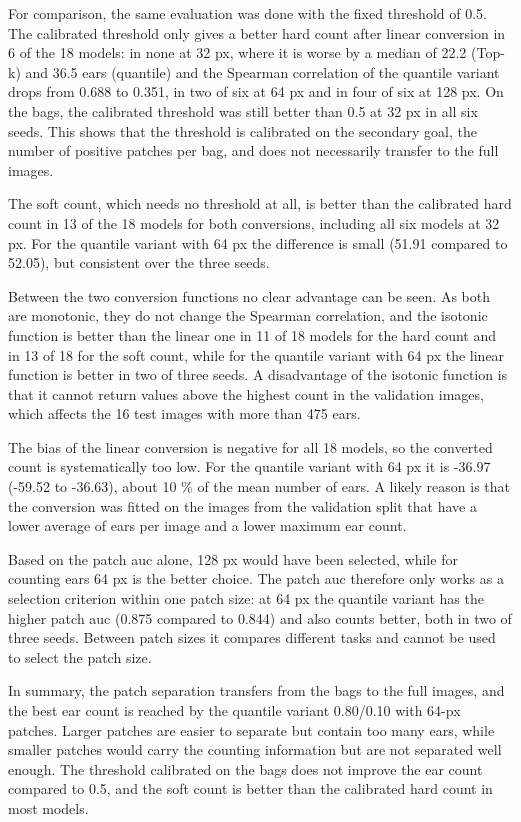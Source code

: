 \documentclass[12pt,parskip = half, DIV=classic,listof=totoc]{scrartcl}
\begin{document}
		For comparison, the same evaluation was done with the fixed threshold of 0.5. The calibrated threshold only 
		gives a better hard count after linear conversion in 6 of the 18 models: in none at 32 px, where it is 
		worse by a median of 22.2 (Top-k) and 36.5 ears (quantile) and the Spearman correlation of the quantile 
		variant drops from 0.688 to 0.351, in two of six at 64 px and in four of six at 128 px. On the bags, the 
		calibrated threshold was still better than 0.5 at 32 px in all six seeds. This shows that the threshold is 
		calibrated on the secondary goal, the number of positive patches per bag, and does not necessarily transfer 
		to the full images.


		The soft count, which needs no threshold at all, is better than the calibrated hard count in 13 of the 
		18 models for both conversions, including all six models at 32 px. For the quantile variant with 64 px 
		the difference is small (51.91 compared to 52.05), but consistent over the three seeds.

		Between the two conversion functions no clear advantage can be seen. As both are monotonic, they 
		do not change the Spearman correlation, and the isotonic function is better than the linear 
		one in 11 of 18 models for the hard count and in 13 of 18 for the soft count, while for 
		the quantile variant with 64 px the linear function is better in two of three seeds. A 
		disadvantage of the isotonic function is that it cannot return values above the highest 
		count in the validation images, which affects the 16 test images with more than 475 ears.

		The bias of the linear conversion is negative for all 18 models, so the converted count is 
		systematically too low. For the quantile variant with 64 px it is -36.97 (-59.52 to -36.63), 
		about 10 \% of the mean number of ears. A likely reason is that the conversion was fitted on 
		the images from the validation split that have a lower average of ears per image and a lower maximum ear count.

		Based on the patch \ac{auc} alone, 128 px would have been selected, while for counting ears 64 px is the 
		better choice. The patch \ac{auc} therefore only works as a selection criterion within one patch size: 
		at 64 px the quantile variant has the higher patch \ac{auc} (0.875 compared to 0.844) and also counts 
		better, both in two of three seeds. Between patch sizes it compares different tasks and cannot 
		be used to select the patch size.

		In summary, the patch separation transfers from the bags to the full images, and the best ear 
		count is reached by the quantile variant 0.80/0.10 with 64-px patches. Larger patches are easier 
		to separate but contain too many ears, while smaller patches would carry the counting information 
		but are not separated well enough. The threshold calibrated on the bags does not improve the ear 
		count compared to 0.5, and the soft count is better than the calibrated hard count in most models.
\end{document}
